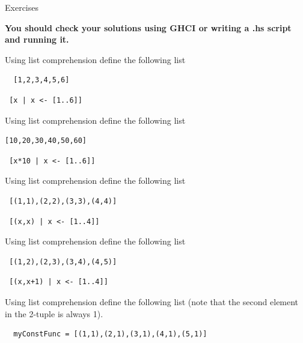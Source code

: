 \documentclass{article}
\newcommand\fullExTitle{Exercises}
\begin{document}
\begin{Huge}
	\begin{center}
	\fullExTitle
	\end{center}
\end{Huge}
\begin{large}
  \textbf{You should check your solutions using GHCI or writing a .hs script and running it.}
\end{large}


\begin{exercise}
Using list comprehension define the following list
\begin{lstlisting}
  [1,2,3,4,5,6]
\end{lstlisting}
\end{exercise}
\begin{solution}
\begin{lstlisting}
 [x | x <- [1..6]]
\end{lstlisting}
\end{solution}
\begin{exercise}
Using list comprehension define the following list
\begin{lstlisting}
[10,20,30,40,50,60]
\end{lstlisting}
\end{exercise}
\begin{solution}
\begin{lstlisting}
 [x*10 | x <- [1..6]]
\end{lstlisting}
\end{solution}
\begin{exercise}
Using list comprehension define the following list
\begin{lstlisting}
 [(1,1),(2,2),(3,3),(4,4)]
\end{lstlisting}
\end{exercise}
\begin{solution}
\begin{lstlisting}
 [(x,x) | x <- [1..4]]
\end{lstlisting}
\end{solution}
\pagebreak
\begin{exercise}
Using list comprehension define the following list
\begin{lstlisting}
 [(1,2),(2,3),(3,4),(4,5)]
\end{lstlisting}
\end{exercise}
\begin{solution}
\begin{lstlisting}
 [(x,x+1) | x <- [1..4]]
\end{lstlisting}
\end{solution}
%
\begin{exercise}
Using list comprehension define the following list (note that the second element in the 2-tuple is always 1).
\begin{lstlisting}
  myConstFunc = [(1,1),(2,1),(3,1),(4,1),(5,1)]
\end{lstlisting}
\end{exercise}
\end{document}
